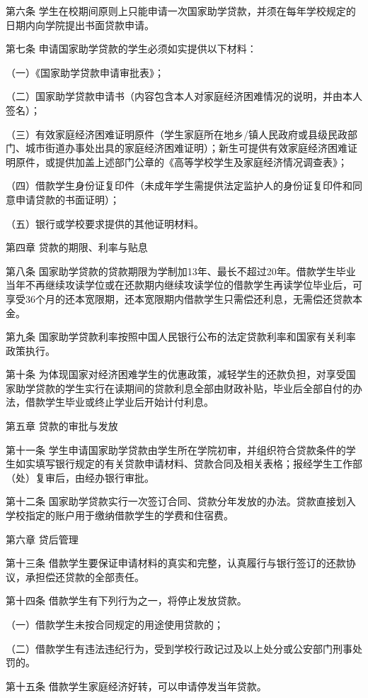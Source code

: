 \documentclass[UTF8,12pt,a4paper]{report}
\begin{document}
第六条 学生在校期间原则上只能申请一次国家助学贷款，并须在每年学校规定的日期内向学院提出书面贷款申请。

第七条 申请国家助学贷款的学生必须如实提供以下材料：

（一）《国家助学贷款申请审批表》；

（二）国家助学贷款申请书（内容包含本人对家庭经济困难情况的说明，并由本人签名）；

（三）有效家庭经济困难证明原件（学生家庭所在地乡/镇人民政府或县级民政部门、城市街道办事处出具的家庭经济困难证明）；新生可提供有效家庭经济困难证明原件，或提供加盖上述部门公章的《高等学校学生及家庭经济情况调查表》；

（四）借款学生身份证复印件（未成年学生需提供法定监护人的身份证复印件和同意申请贷款的书面证明）；

（五）银行或学校要求提供的其他证明材料。

第四章 贷款的期限、利率与贴息

第八条 国家助学贷款的贷款期限为学制加13年、最长不超过20年。借款学生毕业当年不再继续攻读学位或在还款期内继续攻读学位的借款学生再读学位毕业后，可享受36个月的还本宽限期，还本宽限期内借款学生只需偿还利息，无需偿还贷款本金。

第九条 国家助学贷款利率按照中国人民银行公布的法定贷款利率和国家有关利率政策执行。

第十条 为体现国家对经济困难学生的优惠政策，减轻学生的还款负担，对享受国家助学贷款的学生实行在读期间的贷款利息全部由财政补贴，毕业后全部自付的办法，借款学生毕业或终止学业后开始计付利息。

第五章 贷款的审批与发放

第十一条 学生申请国家助学贷款由学生所在学院初审，并组织符合贷款条件的学生如实填写银行规定的有关贷款申请材料、贷款合同及相关表格；报经学生工作部（处）复审后，由经办银行审批。

第十二条 国家助学贷款实行一次签订合同、贷款分年发放的办法。贷款直接划入学校指定的账户用于缴纳借款学生的学费和住宿费。

第六章 贷后管理

第十三条 借款学生要保证申请材料的真实和完整，认真履行与银行签订的还款协议，承担偿还贷款的全部责任。

第十四条 借款学生有下列行为之一，将停止发放贷款。

（一）借款学生未按合同规定的用途使用贷款的；

（二）借款学生有违法违纪行为，受到学校行政记过及以上处分或公安部门刑事处罚的。

第十五条 借款学生家庭经济好转，可以申请停发当年贷款。
\end{document}
